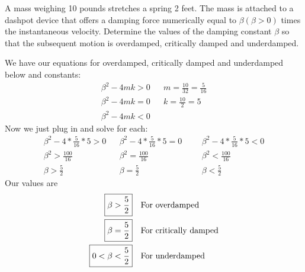 \documentclass{article}
\begin{document}
\subsubsection{}

A mass weighing 10 pounds stretches a spring 2 feet. The mass is attached to a dashpot device that offers a damping force numerically equal to $ \beta(\beta > 0) $ times the instantaneous velocity. Determine the values of the damping constant $\beta$ so that the subsequent motion is overdamped, critically damped and underdamped.

We have our equations for overdamped, critically damped and underdamped below and constants:
\begin{align*}
    \beta^2 - 4mk > 0 && m = \frac{10}{32} = \frac{5}{16}\\
    \beta^2 - 4mk = 0  && k = \frac{10}{2} = 5 \\
    \beta^2 - 4mk < 0 
\end{align*}
Now we just plug in and solve for each:
\begin{align*}
    \beta^2 - 4*\frac{5}{16} * 5 > 0 && \beta^2 - 4*\frac{5}{16} * 5 = 0 &&& \beta^2 - 4*\frac{5}{16} * 5 < 0 \\
    \beta^2 > \frac{100}{16} && \beta^2 = \frac{100}{16} &&& \beta^2 < \frac{100}{16} \\
    \beta > \frac{5}{2} && \beta = \frac{5}{2} &&& \beta < \frac{5}{2}
\end{align*}
Our values are
\begin{align*}
    \Aboxed{\beta > \frac{5}{2}} && \text{For overdamped}\\
    \Aboxed{\beta = \frac{5}{2}} && \text{For critically damped}\\
    \Aboxed{0 < \beta < \frac{5}{2}} && \text{For underdamped}
\end{align*}
       
\end{document}
